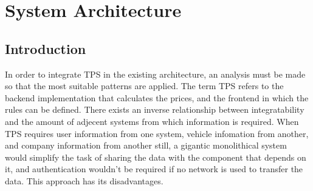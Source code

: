 \graphicspath{{Chapter3/Figs/Vector/}{Chapter3/Figs/}}

%
\chapter{System Architecture}
\section{Introduction}
In order to integrate TPS in the existing architecture, an analysis must be made so that the most suitable patterns are applied. The term TPS refers to the backend implementation that calculates the prices, and the frontend in which the rules can be defined. There exists an inverse relationship between integratability and the amount of adjecent systems from which information is required. When TPS requires user information from one system, vehicle infomation from another, and company information from another still, a gigantic monolithical system would simplify the task of sharing the data with the component that depends on it, and authentication wouldn't be required if no network is used to transfer the data. This approach has its disadvantages.

%
